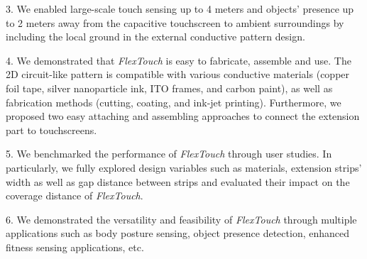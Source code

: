 3. We enabled large-scale touch sensing up to 4 meters and objects' presence up to 2 meters away from the capacitive touchscreen to ambient surroundings by including the local ground in the external conductive pattern design. 

4. We demonstrated that \textit{FlexTouch} is easy to fabricate, assemble and use. The 2D circuit-like pattern is compatible with various conductive materials (copper foil tape, silver nanoparticle ink, ITO frames, and carbon paint), as well as fabrication methods (cutting, coating, and ink-jet printing). Furthermore, we proposed two easy attaching and assembling approaches to connect the extension part to touchscreens. 

5. We benchmarked the performance of \textit{FlexTouch} through user studies. In particularly, we fully explored design variables such as materials, extension strips' width as well as gap distance between strips and evaluated their impact on the coverage distance of \textit{FlexTouch}. 

6. We demonstrated the versatility and feasibility of \textit{FlexTouch} through multiple applications such as body posture sensing, object presence detection, enhanced fitness sensing applications, etc.

